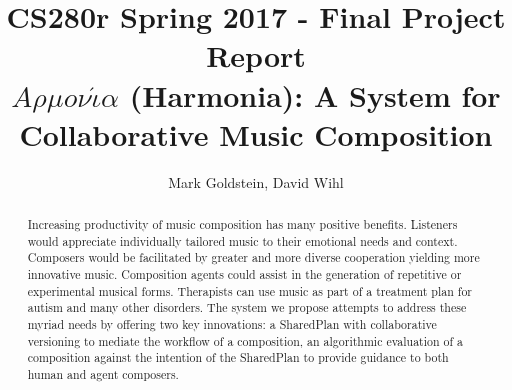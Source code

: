 \documentclass[final,authoryear,11pt,times]{elsarticle}
\begin{document}
\begin{frontmatter}



\title{CS280r Spring 2017 - Final Project Report \\ $A \rho \mu o \nu \acute{\iota} \alpha$ (Harmonia): A System for Collaborative Music Composition}


\author{Mark Goldstein, David Wihl}
\address{\{markgoldstein,davidwihl\}@g.harvard.edu}

\begin{abstract}
Increasing productivity of music composition has many positive benefits. Listeners
would appreciate individually tailored music to their emotional needs and context.
Composers would be facilitated by greater and more diverse cooperation yielding more
innovative music. Composition agents could assist in the generation of repetitive or 
experimental musical forms. Therapists can use music as part of a treatment plan 
for autism and
many other disorders. The system we propose attempts to address these myriad needs 
by offering two key innovations: a SharedPlan with collaborative versioning to mediate the workflow of a composition, an algorithmic evaluation of a composition against the intention of the
SharedPlan to provide guidance to both human and agent composers.

\end{abstract}
\end{frontmatter}


\end{document}
